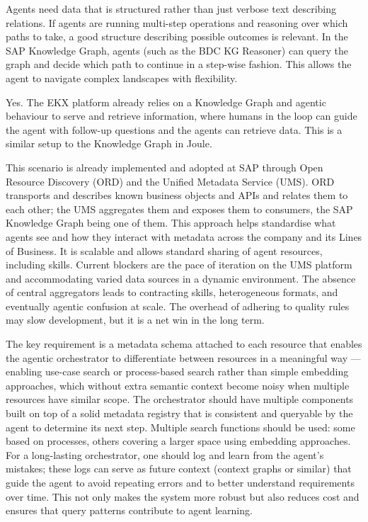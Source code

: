 Agents need data that is structured rather than just verbose text describing relations. If agents are running multi-step operations and reasoning over which paths to take, a good structure describing possible outcomes is relevant. In the SAP Knowledge Graph, agents (such as the BDC KG Reasoner) can query the graph and decide which path to continue in a step-wise fashion. This allows the agent to navigate complex landscapes with flexibility.

\medskip{}

Yes. The EKX platform already relies on a Knowledge Graph and agentic behaviour to serve and retrieve information, where humans in the loop can guide the agent with follow-up questions and the agents can retrieve data. This is a similar setup to the Knowledge Graph in Joule.

\medskip{}

This scenario is already implemented and adopted at SAP through Open Resource Discovery (ORD) and the Unified Metadata Service (UMS). ORD transports and describes known business objects and APIs and relates them to each other; the UMS aggregates them and exposes them to consumers, the SAP Knowledge Graph being one of them. This approach helps standardise what agents see and how they interact with metadata across the company and its Lines of Business. It is scalable and allows standard sharing of agent resources, including skills. Current blockers are the pace of iteration on the UMS platform and accommodating varied data sources in a dynamic environment. The absence of central aggregators leads to contracting skills, heterogeneous formats, and eventually agentic confusion at scale. The overhead of adhering to quality rules may slow development, but it is a net win in the long term.

\medskip{}

The key requirement is a metadata schema attached to each resource that enables the agentic orchestrator to differentiate between resources in a meaningful way --- enabling use-case search or process-based search rather than simple embedding approaches, which without extra semantic context become noisy when multiple resources have similar scope. The orchestrator should have multiple components built on top of a solid metadata registry that is consistent and queryable by the agent to determine its next step. Multiple search functions should be used: some based on processes, others covering a larger space using embedding approaches. For a long-lasting orchestrator, one should log and learn from the agent's mistakes; these logs can serve as future context (context graphs or similar) that guide the agent to avoid repeating errors and to better understand requirements over time. This not only makes the system more robust but also reduces cost and ensures that query patterns contribute to agent learning.

